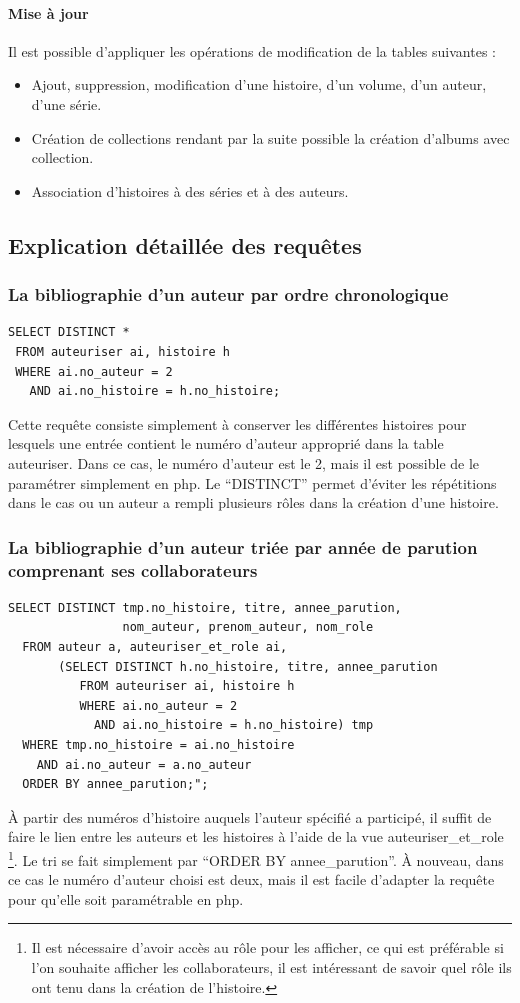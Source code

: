 \documentclass[12pt]{article}
\begin{document}
\paragraph{Mise à jour}
Il est possible d'appliquer les opérations de modification de la tables
suivantes :
\begin{itemize}
	\item Ajout, suppression, modification d’une histoire, d’un volume, d’un
		auteur, d'une série.
	\item Création de collections rendant par la suite possible la création
		d'albums avec collection.
	\item Association d'histoires à des séries et à des auteurs.
\end{itemize}

\subsection{Explication détaillée des requêtes}

\subsubsection*{La bibliographie d'un auteur par ordre chronologique}
\begin{lstlisting}
SELECT DISTINCT *
 FROM auteuriser ai, histoire h
 WHERE ai.no_auteur = 2
   AND ai.no_histoire = h.no_histoire;
\end{lstlisting}
Cette requête consiste simplement à conserver les différentes histoires pour
lesquels une entrée contient le numéro d'auteur approprié dans la table
auteuriser. Dans ce cas, le numéro d'auteur est le 2, mais il est possible
de le paramétrer simplement en php. Le ``DISTINCT'' permet d'éviter les
répétitions dans le cas ou un auteur a rempli plusieurs rôles dans la
création d'une histoire.

\subsubsection*{La bibliographie d'un auteur triée par année de parution
comprenant ses collaborateurs}
\begin{lstlisting}
SELECT DISTINCT tmp.no_histoire, titre, annee_parution,
                nom_auteur, prenom_auteur, nom_role
  FROM auteur a, auteuriser_et_role ai,
       (SELECT DISTINCT h.no_histoire, titre, annee_parution
          FROM auteuriser ai, histoire h
          WHERE ai.no_auteur = 2
            AND ai.no_histoire = h.no_histoire) tmp
  WHERE tmp.no_histoire = ai.no_histoire
    AND ai.no_auteur = a.no_auteur
  ORDER BY annee_parution;";
\end{lstlisting}
À partir des numéros d'histoire auquels l'auteur spécifié a participé, il
suffit de faire le lien entre les auteurs et les histoires à l'aide de la vue
auteuriser\_et\_role \footnote{Il est nécessaire d'avoir accès au rôle pour
les afficher, ce qui est préférable si l'on souhaite afficher les
collaborateurs, il est intéressant de savoir quel rôle ils ont tenu dans la
création de l'histoire.}. Le tri se fait simplement par
``ORDER BY annee\_parution''. À nouveau, dans ce cas le numéro d'auteur
choisi est deux, mais il est facile d'adapter la requête pour qu'elle soit
paramétrable en php.
\end{document}
